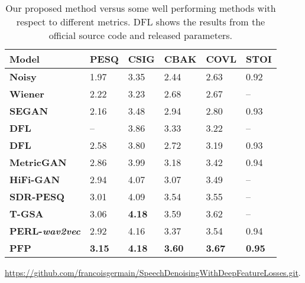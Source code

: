 \documentclass[a4paper]{article}
\begin{document}
\begin{table}[t]
\begin{threeparttable}
\caption{Our proposed method versus some well performing methods with respect to different metrics. DFL\tnote{} shows the results from the official source code and released parameters.}
\centering
\small
\begin{tabular*}{\linewidth}{l|P{5.8mm} P{5.8mm} P{5.8mm} P{5.8mm} P{5.8mm}}
\hline
Model  & PESQ & CSIG & CBAK & COVL & STOI\\
\hline
\hline
\textbf{Noisy} & 1.97 & 3.35 & 2.44 & 2.63 & 0.92\\
\textbf{Wiener \cite{paliwal1987speech}} & 2.22 & 3.23 & 2.68 & 2.67 & --\\
\textbf{SEGAN \cite{pascual2017segan}} & 2.16 & 3.48 & 2.94 & 2.80 & 0.93\\
\textbf{DFL \cite{germain2019speech}} & -- & 3.86 & 3.33 & 3.22 & --\\
\textbf{DFL}\tnote{} & 2.58 & 3.80 & 2.72 & 3.19 & 0.93\\
\textbf{MetricGAN \cite{fu2019metricgan}} & 2.86 & 3.99 & 3.18 & 3.42 & 0.94\\
\textbf{HiFi-GAN \cite{su2020hifi}} & 2.94 & 4.07 & 3.07 & 3.49 & --\\
\textbf{SDR-PESQ \cite{kim2019end}} & 3.01 & 4.09 & 3.54 & 3.55 & --\\
\textbf{T-GSA \cite{kim2020t}} & 3.06 & {\bf 4.18} & 3.59 & 3.62 & --\\
\textbf{PERL-{\it wav2vec} \cite{kataria2020perceptual}} & 2.92 & 4.16 & 3.37 & 3.54 & 0.94\\
\hline
\hline
\textbf{PFP} & \textbf{3.15} & \textbf{4.18} & \textbf{3.60} & \textbf{3.67} & \textbf{0.95}\\
\hline
\end{tabular*}
\begin{tablenotes}
\scriptsize
\item[] \href{https://github.com/francoisgermain/SpeechDenoisingWithDeepFeatureLosses.git}{https://github.com/francoisgermain/SpeechDenoisingWithDeepFeatureLosses.git}.
\end{tablenotes}
\label{tab:denoise}
\end{threeparttable}
\end{table}
\end{document}
